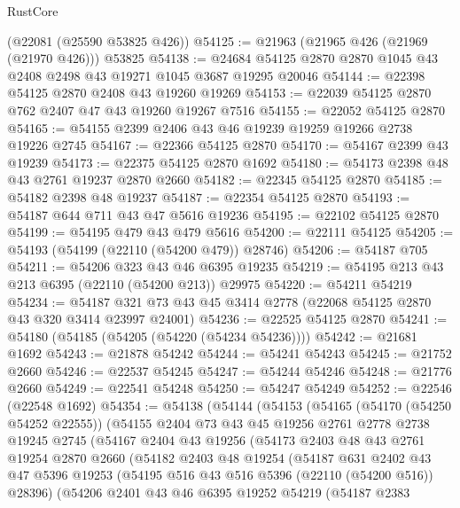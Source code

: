 \begin{lexlean}{RustCore}
\begin{coremodule}
    (@22081 (@25590 @53825 @426))
@54125 := @21963 (@21965 @426 (@21969 (@21970 @426))) @53825
@54138 := @24684 @54125 @2870 @2870 @1045 @43 @2408 @2498 @43 @19271 @1045 @3687 @19295 @20046
@54144 := @22398 @54125 @2870 @2408 @43 @19260 @19269
@54153 := @22039 @54125 @2870 @762 @2407 @47 @43 @19260 @19267 @7516
@54155 := @22052 @54125 @2870
@54165 := @54155 @2399 @2406 @43 @46 @19239 @19259 @19266 @2738 @19226 @2745
@54167 := @22366 @54125 @2870
@54170 := @54167 @2399 @43 @19239
@54173 := @22375 @54125 @2870 @1692
@54180 := @54173 @2398 @48 @43 @2761 @19237 @2870 @2660
@54182 := @22345 @54125 @2870
@54185 := @54182 @2398 @48 @19237
@54187 := @22354 @54125 @2870
@54193 := @54187 @644 @711 @43 @47 @5616 @19236
@54195 := @22102 @54125 @2870
@54199 := @54195 @479 @43 @479 @5616
@54200 := @22111 @54125
@54205 := @54193 (@54199 (@22110 (@54200 @479)) @28746)
@54206 := @54187 @705
@54211 := @54206 @323 @43 @46 @6395 @19235
@54219 := @54195 @213 @43 @213 @6395 (@22110 (@54200 @213)) @29975
@54220 := @54211 @54219
@54234 := @54187 @321 @73 @43 @45 @3414 @2778 (@22068 @54125 @2870 @43 @320 @3414 @23997 @24001)
@54236 := @22525 @54125 @2870
@54241 := @54180 (@54185 (@54205 (@54220 (@54234 @54236))))
@54242 := @21681 @1692
@54243 := @21878 @54242
@54244 := @54241 @54243
@54245 := @21752 @2660
@54246 := @22537 @54245
@54247 := @54244 @54246
@54248 := @21776 @2660
@54249 := @22541 @54248
@54250 := @54247 @54249
@54252 := @22546 (@22548 @1692)
@54354 := @54138
    (@54144
      (@54153
        (@54165
          (@54170 (@54250 @54252 @22555))
          (@54155
            @2404
            @73
            @43
            @45
            @19256
            @2761
            @2778
            @2738
            @19245
            @2745
            (@54167
              @2404
              @43
              @19256
              (@54173
                @2403
                @48
                @43
                @2761
                @19254
                @2870
                @2660
                (@54182
                  @2403
                  @48
                  @19254
                  (@54187
                    @631
                    @2402
                    @43
                    @47
                    @5396
                    @19253
                    (@54195 @516 @43 @516 @5396 (@22110 (@54200 @516)) @28396)
                    (@54206
                      @2401
                      @43
                      @46
                      @6395
                      @19252
                      @54219
                      (@54187
                        @2383

\end{coremodule}
\end{lexlean}
